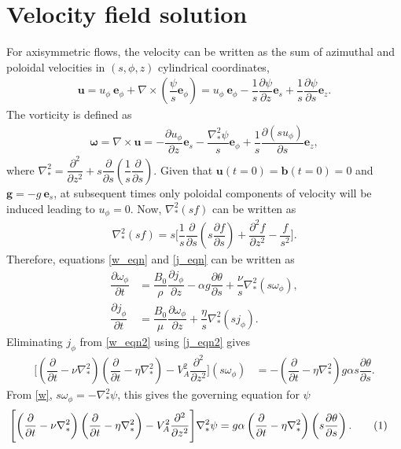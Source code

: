 \documentclass[12pt,psfig]{article}
\newcommand\numberthis{\addtocounter{equation}{1}\tag{\theequation}}
\begin{document}
\section{Velocity field solution}
For axisymmetric flows,  the velocity can be written as the sum of azimuthal and poloidal velocities in $(s,\phi,z)$ cylindrical coordinates,
\begin{align}
\bm u= u_\phi \ \bm e_\phi + \nabla \times \left(\dfrac{\psi}{s} \bm e_\phi\right)=u_\phi \ \bm e_\phi-\dfrac{1}{s}\dfrac{\partial \psi}{\partial z}\bm e_s+\dfrac{1}{s}\dfrac{\partial \psi}{\partial s} \bm e_z. \label{u}
\end{align} 
The vorticity is defined as
\begin{align}
\bm \omega = \nabla \times \bm u =-\dfrac{\partial u_\phi}{\partial z} \bm e_s - \dfrac{\nabla_*^2\psi}{s} \bm e_\phi+\dfrac{1}{s}\dfrac{\partial (su_\phi)}{\partial s} \bm e_z, \label{w}
\end{align}
where $\nabla_*^2=\dfrac{\partial^2 }{\partial z^2}+s\dfrac{\partial}{\partial s}\left(\dfrac{1}{s}\dfrac{\partial }{\partial s}\right)$. Given that $\bm u(t=0)=\bm b(t=0)=0$ and $\bm g=-g \ \bm e_s$,  at subsequent times only poloidal components of velocity will be induced leading to $ u_\phi=0$. 
Now, $\nabla_*^2(sf)$ can be written as
\begin{align*}
\nabla_*^2(sf)=s\Biggl[\dfrac{1}{s}\dfrac{\partial }{\partial s}\left(s\dfrac{\partial f}{\partial s}\right)+\dfrac{\partial^2f}{\partial z^2}-\dfrac{f}{s^2}\Biggr].
\end{align*}
Therefore, equations \eqref{w_eqn} and \eqref{j_eqn} can be written as
\begin{align}
\dfrac{\partial \omega_\phi}{\partial t}&=\dfrac{B_0}{\rho}\dfrac{\partial j_\phi}{\partial z}-\alpha g\dfrac{\partial \theta}{\partial s}+ \dfrac{\nu}{s}\nabla_*^2(s\omega_\phi)\label{w_eqn2}, \\
\dfrac{\partial j_\phi}{\partial t}&=\dfrac{B_0}{\mu}\dfrac{\partial \omega_\phi}{\partial z}+ \dfrac{\eta}{s}\nabla_*^2(s j_\phi)\label{j_eqn2}.
\end{align}
Eliminating $j_\phi$ from \eqref{w_eqn2} using \eqref{j_eqn2} gives
\begin{align*}
\Biggl[\left(\dfrac{\partial }{\partial t}-\nu\nabla_*^2\right)\left(\dfrac{\partial }{\partial t}-\eta\nabla_*^2\right)-V_A^2\dfrac{\partial^2}{\partial z^2}\Biggr](s\omega_\phi)&=-\left(\dfrac{\partial }{\partial t}-\eta\nabla_*^2\right)g\alpha s\dfrac{\partial \theta}{\partial s}. 
\end{align*}
From \eqref{w}, $s\omega_\phi=-\nabla_*^2\psi$, this gives the 
governing equation for $\psi$
\begin{align*}
\Biggl[\left(\dfrac{\partial }{\partial t}-\nu\nabla_*^2\right)\left(\dfrac{\partial }{\partial t}-\eta\nabla_*^2\right)-V_A^2\dfrac{\partial^2}{\partial z^2}\Biggr]\nabla_*^2\psi&=g\alpha\left(\dfrac{\partial }{\partial t}-\eta\nabla_*^2\right)\left(s\dfrac{\partial \theta}{\partial s}\right).
\numberthis \label{psi_eqn} 
\end{align*}
\end{document}
